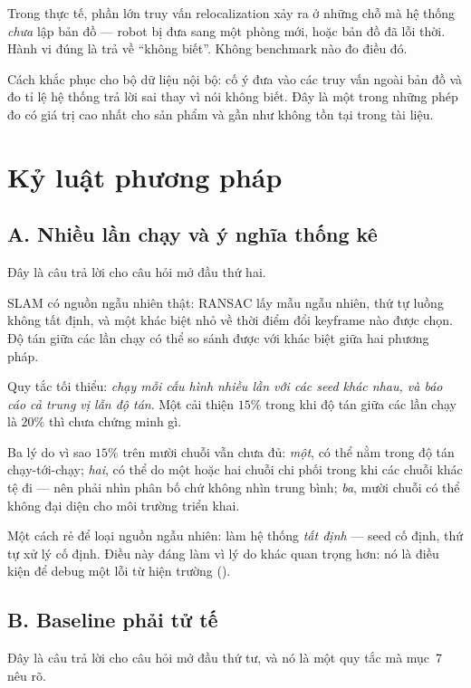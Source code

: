 \documentclass[../../vslam.tex]{subfiles}
\begin{document}
Trong thực tế, phần lớn truy vấn relocalization xảy ra ở những chỗ mà hệ thống \emph{chưa} lập bản đồ --- robot bị đưa sang một phòng mới, hoặc bản đồ đã lỗi thời. Hành vi đúng là trả về ``không biết''. Không benchmark nào đo điều đó.

Cách khắc phục cho bộ dữ liệu nội bộ: cố ý đưa vào các truy vấn ngoài bản đồ và đo tỉ lệ hệ thống trả lời sai thay vì nói không biết. Đây là một trong những phép đo có giá trị cao nhất cho sản phẩm và gần như không tồn tại trong tài liệu.

\section{Kỷ luật phương pháp}

\subsection{A. Nhiều lần chạy và ý nghĩa thống kê}

Đây là câu trả lời cho câu hỏi mở đầu thứ hai.

SLAM có nguồn ngẫu nhiên thật: RANSAC lấy mẫu ngẫu nhiên, thứ tự luồng không tất định, và một khác biệt nhỏ về thời điểm đổi keyframe nào được chọn. Độ tán giữa các lần chạy có thể so sánh được với khác biệt giữa hai phương pháp.

Quy tắc tối thiểu: \emph{chạy mỗi cấu hình nhiều lần với các seed khác nhau, và báo cáo cả trung vị lẫn độ tán}. Một cải thiện \(15\%\) trong khi độ tán giữa các lần chạy là \(20\%\) thì chưa chứng minh gì.

Ba lý do vì sao \(15\%\) trên mười chuỗi vẫn chưa đủ: \emph{một}, có thể nằm trong độ tán chạy-tới-chạy; \emph{hai}, có thể do một hoặc hai chuỗi chi phối trong khi các chuỗi khác tệ đi --- nên phải nhìn phân bố chứ không nhìn trung bình; \emph{ba}, mười chuỗi có thể không đại diện cho môi trường triển khai.

Một cách rẻ để loại nguồn ngẫu nhiên: làm hệ thống \emph{tất định} --- seed cố định, thứ tự xử lý cố định. Điều này đáng làm vì lý do khác quan trọng hơn: nó là điều kiện để debug một lỗi từ hiện trường ().

\subsection{B. Baseline phải tử tế}

Đây là câu trả lời cho câu hỏi mở đầu thứ tư, và nó là một quy tắc mà  mục~7 nêu rõ.
\end{document}
